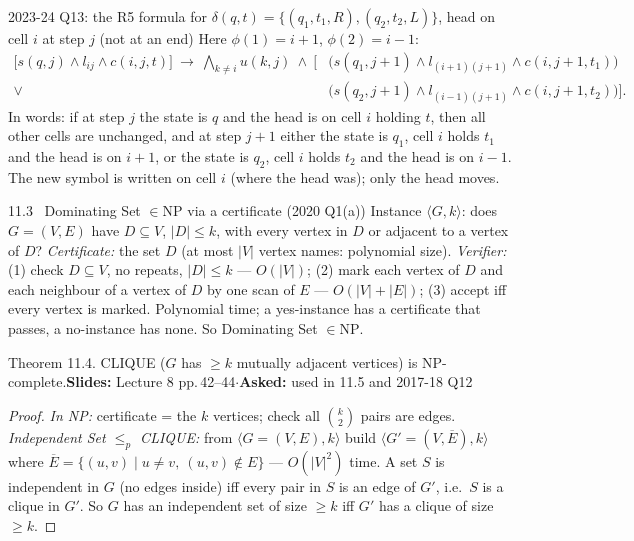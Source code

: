 \documentclass[10.5pt,a4paper]{article}
\newcommand{\src}[2]{{\footnotesize\color{gray!70!black}\textbf{Slides:} #1\enspace$\cdot$\enspace\textbf{Asked:} #2}\par}
\newcommand{\NP}{\mathrm{NP}}
\begin{document}
\begin{ans}{2023-24 Q13: the R5 formula for $\delta(q,t)=\{(q_1,t_1,R),(q_2,t_2,L)\}$, head on cell $i$ at step $j$ (not at an end)}
Here $\phi(1)=i+1$, $\phi(2)=i-1$:
\[\begin{aligned}\big[s(q,j)\wedge l_{ij}\wedge c(i,j,t)\big]\ \to\ \bigwedge_{k\ne i}u(k,j)\ \wedge\ \Big[&\big(s(q_1,j{+}1)\wedge l_{(i+1)(j+1)}\wedge c(i,j{+}1,t_1)\big)\\
\vee\ &\big(s(q_2,j{+}1)\wedge l_{(i-1)(j+1)}\wedge c(i,j{+}1,t_2)\big)\Big].\end{aligned}\]
In words: if at step $j$ the state is $q$ and the head is on cell $i$ holding $t$, then all other cells are unchanged, and at step $j+1$ either
the state is $q_1$, cell $i$ holds $t_1$ and the head is on $i+1$, or the state is $q_2$, cell $i$ holds $t_2$ and the head is on $i-1$. The new
symbol is written on cell $i$ (where the head was); only the head moves.
\end{ans}

\begin{ans}{11.3 \ Dominating Set $\in\NP$ via a certificate (2020 Q1(a))}
Instance $\langle G,k\rangle$: does $G=(V,E)$ have $D\subseteq V$, $|D|\le k$, with every vertex in $D$ or adjacent to a vertex of $D$?
\emph{Certificate:} the set $D$ (at most $|V|$ vertex names: polynomial size). \emph{Verifier:} (1) check $D\subseteq V$, no repeats,
$|D|\le k$ --- $O(|V|)$; (2) mark each vertex of $D$ and each neighbour of a vertex of $D$ by one scan of $E$ --- $O(|V|+|E|)$; (3) accept iff
every vertex is marked. Polynomial time; a yes-instance has a certificate that passes, a no-instance has none. So Dominating Set $\in\NP$.
\end{ans}

\begin{thm}{Theorem 11.4. CLIQUE ($G$ has $\ge k$ mutually adjacent vertices) is NP-complete.}\src{Lecture 8 pp.\,42--44}{used in 11.5 and 2017-18 Q12}\end{thm}
\begin{proof}
\emph{In NP:} certificate = the $k$ vertices; check all $\binom k2$ pairs are edges. \emph{Independent Set $\le_p$ CLIQUE:} from $\langle G=(V,E),k\rangle$
build $\langle G'=(V,\overline E),k\rangle$ where $\overline E=\{(u,v)\mid u\ne v,\ (u,v)\notin E\}$ --- $O(|V|^2)$ time. A set $S$ is independent in
$G$ (no edges inside) iff every pair in $S$ is an edge of $G'$, i.e.\ $S$ is a clique in $G'$. So $G$ has an independent set of size $\ge k$ iff
$G'$ has a clique of size $\ge k$.
\end{proof}
\end{document}

